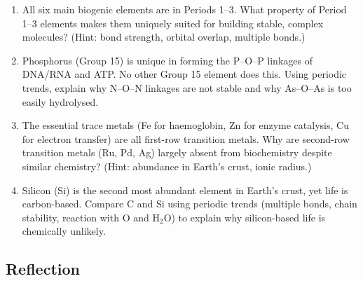 \documentclass[12pt, a4paper]{book}
\begin{document}
\begin{deepbox}
\begin{enumerate}[label=\textbf{D\arabic*.}]
        \begin{enumerate}[label=(\alph*)]
          \item All six main biogenic elements are in
                Periods 1--3.
                What property of Period 1--3 elements
                makes them uniquely suited for building
                stable, complex molecules?
                (Hint: bond strength, orbital overlap,
                multiple bonds.)
          \item Phosphorus (Group 15) is unique in
                forming the P--O--P linkages of DNA/RNA
                and ATP.
                No other Group 15 element does this.
                Using periodic trends, explain why N--O--N
                linkages are not stable and why As--O--As
                is too easily hydrolysed.
          \item The essential trace metals (Fe for
                haemoglobin, Zn for enzyme catalysis,
                Cu for electron transfer) are all
                first-row transition metals.
                Why are second-row transition metals
                (Ru, Pd, Ag) largely absent from
                biochemistry despite similar chemistry?
                (Hint: abundance in Earth's crust, ionic radius.)
          \item Silicon (Si) is the second most abundant
                element in Earth's crust, yet life is
                carbon-based.
                Compare C and Si using periodic trends
                (multiple bonds, chain stability, reaction
                with O and H$_2$O) to explain why
                silicon-based life is chemically unlikely.
        \end{enumerate}

\end{enumerate}
\end{deepbox}

\subsection*{Reflection}
\end{document}
